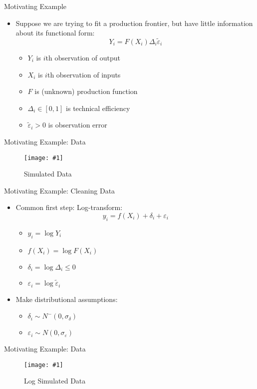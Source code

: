 \documentclass{beamer}
\newcommand{\ep}{\varepsilon}
\newcommand{\img}[1]{\texttt{[image: \#1]}}
\begin{document}
	
\begin{frame}{Motivating Example}
\begin{itemize}
	\item Suppose we are trying to fit a production frontier, but have little information about its functional form: $$Y_i = F(X_i)\Delta_i \tilde\ep_i$$
		\begin{itemize}
			\item $Y_i$ is $i$th observation of output
			\item $X_i$ is $i$th observation of inputs
			\item $F$ is (unknown) production function
			\item $\Delta_i\in[0, 1]$ is technical efficiency
			\item $\tilde\ep_i > 0$ is observation error
		\end{itemize}
\end{itemize}
\end{frame}

\begin{frame}{Motivating Example: Data}
\begin{figure}
	\centering
	\img{figures/data.pdf}
	\caption{Simulated Data}
\end{figure}
\end{frame}

\begin{frame}{Motivating Example: Cleaning Data}
\begin{itemize}
	\item Common first step: Log-transform: $$y_i = f(X_i) + \delta_i + \ep_i$$
		\begin{itemize}
			\item $y_i = \log Y_i$
			\item $f(X_i) = \log F(X_i)$
			\item $\delta_i = \log \Delta_i \leq 0$
			\item $\ep_i = \log \tilde\ep_i$
		\end{itemize}
	\item Make distributional assumptions:
		\begin{itemize}
			\item $\delta_i\sim N^-(0, \sigma_\delta)$
			\item $\ep_i\sim N(0, \sigma_\ep)$
		\end{itemize}
\end{itemize}
\end{frame}

\begin{frame}{Motivating Example: Data}
\begin{figure}
	\centering
	\img{figures/data-log.pdf}
	\caption{Log Simulated Data}
\end{figure}
\end{frame}
\end{document}
